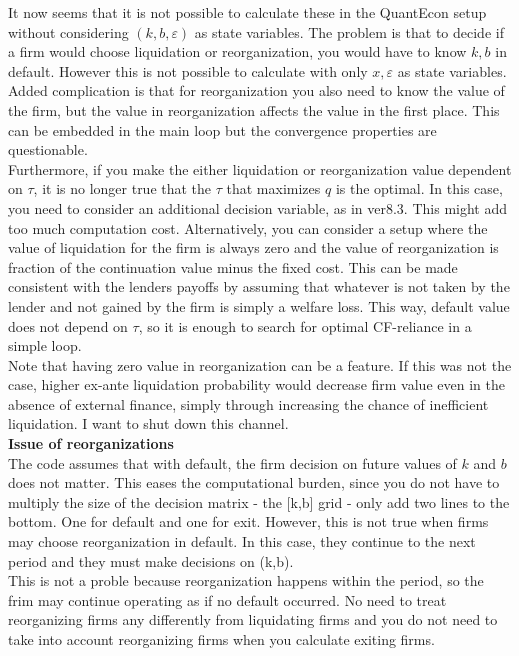 \documentclass[12pt]{article}
\begin{document}
It now seems that it is not possible to calculate these in the QuantEcon setup without considering $(k,b,\varepsilon)$ as state variables. The problem is that to decide if a firm would choose liquidation or reorganization, you would have to know $k,b$ in default. However this is not possible to calculate with only $x,\varepsilon$ as state variables. Added complication is that for reorganization you also need to know the value of the firm, but the value in reorganization affects the value in the first place. This can be embedded in the main loop but the convergence properties are questionable. \vspace{3mm} \\ 
Furthermore, if you make the either liquidation or reorganization value dependent on $\tau$, it is no longer true that the $\tau$ that maximizes $q$ is the optimal. In this case, you need to consider an additional decision variable, as in ver8.3. This might add too much computation cost. Alternatively, you can consider a setup where the value of liquidation for the firm is always zero and the value of reorganization is fraction of the continuation value minus the fixed cost. This can be made consistent with the lenders payoffs by assuming that whatever is not taken by the lender and not gained by the firm is simply a welfare loss. This way, default value does not depend on $\tau$, so it is enough to search for optimal CF-reliance in a simple loop.  \vspace{3mm} \\
Note that having zero value in reorganization can be a feature. If this was not the case, higher ex-ante liquidation probability would decrease firm value even in the absence of external finance, simply through increasing the chance of inefficient liquidation. I want to shut down this channel. \vspace{3mm} \\
\textbf{Issue of reorganizations} \\
The code assumes that with default, the firm decision on future values of $k$ and $b$ does not matter. This eases the computational burden, since you do not have to multiply the size of the decision matrix - the [k,b] grid - only add two lines to the bottom. One for default and one for exit. However, this is not true when firms may choose reorganization in default. In this case, they continue to the next period and they must make decisions on (k,b). \vspace{3mm} \\
This is not a proble because reorganization happens within the period, so the frim may continue operating as if no default occurred. No need to treat reorganizing firms any differently from liquidating firms and you do not need to take into account reorganizing firms when you calculate exiting firms. \vspace{3mm} \\
\end{document}
